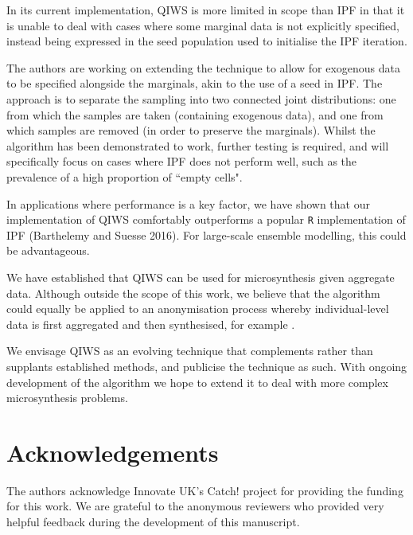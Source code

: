 \documentclass{JASSS}
\begin{document}
In its current implementation, QIWS is more limited in scope than IPF in that it is unable to deal with cases where some marginal data is not explicitly specified, instead being expressed in the seed population used to initialise the IPF iteration. 

The authors are working on extending the technique to allow for
exogenous data to be specified alongside the marginals, akin to the use of a seed in IPF. The approach is to separate the sampling into two connected joint distributions: one from which the samples are taken (containing exogenous data), and one from which samples are removed (in order to preserve the marginals). Whilst the algorithm has been demonstrated to work, further testing is required, and will specifically focus on cases where IPF does not perform well, such as the prevalence of a high proportion of ``empty cells".

 
In applications where performance is a key factor, we have shown that
our implementation of QIWS comfortably outperforms a popular \texttt{R}
implementation of IPF (Barthelemy and Suesse 2016). For large-scale
ensemble modelling, this could be advantageous.

We have established that QIWS can be used for microsynthesis given
aggregate data. Although outside the scope of this work, we believe that
the algorithm could equally be applied to an anonymisation process
whereby individual-level data is first aggregated and then synthesised,
for example \cite{nowok_synthpop:_2016}.

We envisage QIWS as an evolving technique that complements rather than
supplants established methods, and publicise the technique as such. With ongoing development of the algorithm we hope to extend it to deal with more complex microsynthesis problems.

\section{Acknowledgements}\label{acknowledgements}

The authors acknowledge Innovate UK's Catch! project for providing the
funding for this work. We are grateful to the anonymous reviewers who provided very helpful feedback during the development of this manuscript.
\end{document}
